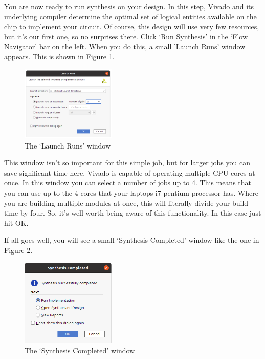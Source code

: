 \documentclass[../physical_computing.tex]{subfiles}
\begin{document}
You are now ready to run synthesis on your design. In this step, Vivado and its underlying compiler determine the optimal set of logical entities available on the chip to implement your circuit. Of course, this design will use very few resources, but it's our first one, so no surprises there. Click `Run Synthesis' in the `Flow Navigator' bar on the left. When you do this, a small 'Launch Runs' window appears. This is shown in Figure \ref{fig:launch_runs}. 

\begin{figure}[htbp]
    \centering
    \includegraphics[width=0.4\textwidth]{figures/launch_runs.png}
    \caption{The `Launch Runs' window}
    \label{fig:launch_runs}
\end{figure}

This window isn't so important for this simple job, but for larger jobs you can save significant time here. Vivado is capable of operating multiple CPU cores at once. In this window you can select a number of jobs up to 4. This means that you can use up to the 4 cores that your laptops i7 pentium processor has. Where you are building multiple modules at once, this will literally divide your build time by four. So, it's well worth being aware of this functionality. In this case just hit OK.

If all goes well, you will see a small `Synthesis Completed' window like the one in Figure \ref{fig:synthesis_completed}. 

\begin{figure}[htbp]
    \centering
    \includegraphics[width=0.4\textwidth]{figures/synthesis_completed.png}
    \caption{The `Synthesis Completed' window}
    \label{fig:synthesis_completed}
\end{figure}
\end{document}
